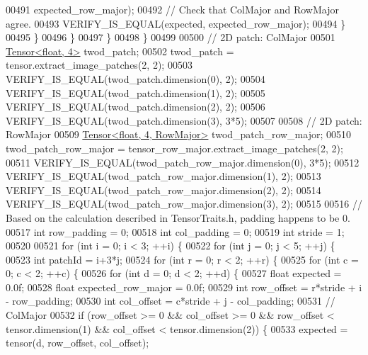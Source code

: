 \begin{DoxyCode}
00491                             expected\_row\_major);
00492             \textcolor{comment}{// Check that ColMajor and RowMajor agree.}
00493             VERIFY\_IS\_EQUAL(expected, expected\_row\_major);
00494           \}
00495         \}
00496       \}
00497     \}
00498   \}
00499 
00500   \textcolor{comment}{// 2D patch: ColMajor}
00501   \hyperlink{class_eigen_1_1_tensor}{Tensor<float, 4>} twod\_patch;
00502   twod\_patch = tensor.extract\_image\_patches(2, 2);
00503   VERIFY\_IS\_EQUAL(twod\_patch.dimension(0), 2);
00504   VERIFY\_IS\_EQUAL(twod\_patch.dimension(1), 2);
00505   VERIFY\_IS\_EQUAL(twod\_patch.dimension(2), 2);
00506   VERIFY\_IS\_EQUAL(twod\_patch.dimension(3), 3*5);
00507 
00508   \textcolor{comment}{// 2D patch: RowMajor}
00509   \hyperlink{class_eigen_1_1_tensor}{Tensor<float, 4, RowMajor>} twod\_patch\_row\_major;
00510   twod\_patch\_row\_major = tensor\_row\_major.extract\_image\_patches(2, 2);
00511   VERIFY\_IS\_EQUAL(twod\_patch\_row\_major.dimension(0), 3*5);
00512   VERIFY\_IS\_EQUAL(twod\_patch\_row\_major.dimension(1), 2);
00513   VERIFY\_IS\_EQUAL(twod\_patch\_row\_major.dimension(2), 2);
00514   VERIFY\_IS\_EQUAL(twod\_patch\_row\_major.dimension(3), 2);
00515 
00516   \textcolor{comment}{// Based on the calculation described in TensorTraits.h, padding happens to be 0.}
00517   \textcolor{keywordtype}{int} row\_padding = 0;
00518   \textcolor{keywordtype}{int} col\_padding = 0;
00519   \textcolor{keywordtype}{int} stride = 1;
00520 
00521   \textcolor{keywordflow}{for} (\textcolor{keywordtype}{int} i = 0; i < 3; ++i) \{
00522     \textcolor{keywordflow}{for} (\textcolor{keywordtype}{int} j = 0; j < 5; ++j) \{
00523       \textcolor{keywordtype}{int} patchId = i+3*j;
00524       \textcolor{keywordflow}{for} (\textcolor{keywordtype}{int} r = 0; r < 2; ++r) \{
00525         \textcolor{keywordflow}{for} (\textcolor{keywordtype}{int} c = 0; c < 2; ++c) \{
00526           \textcolor{keywordflow}{for} (\textcolor{keywordtype}{int} d = 0; d < 2; ++d) \{
00527             \textcolor{keywordtype}{float} expected = 0.0f;
00528             \textcolor{keywordtype}{float} expected\_row\_major = 0.0f;
00529             \textcolor{keywordtype}{int} row\_offset = r*stride + i - row\_padding;
00530             \textcolor{keywordtype}{int} col\_offset = c*stride + j - col\_padding;
00531             \textcolor{comment}{// ColMajor}
00532             \textcolor{keywordflow}{if} (row\_offset >= 0 && col\_offset >= 0 && row\_offset < tensor.dimension(1) && col\_offset < 
      tensor.dimension(2)) \{
00533               expected = tensor(d, row\_offset, col\_offset);

\end{DoxyCode}
